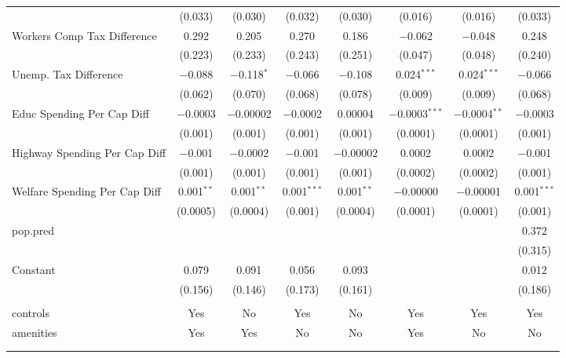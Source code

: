 \begin{table}[!htbp]
\begin{tabular}{@{\extracolsep{5pt}}lccccccc}
  & (0.033) & (0.030) & (0.032) & (0.030) & (0.016) & (0.016) & (0.033) \\ 
  Workers Comp Tax Difference & 0.292 & 0.205 & 0.270 & 0.186 & $-$0.062 & $-$0.048 & 0.248 \\ 
  & (0.223) & (0.233) & (0.243) & (0.251) & (0.047) & (0.048) & (0.240) \\ 
  Unemp. Tax Difference & $-$0.088 & $-$0.118$^{*}$ & $-$0.066 & $-$0.108 & 0.024$^{***}$ & 0.024$^{***}$ & $-$0.066 \\ 
  & (0.062) & (0.070) & (0.068) & (0.078) & (0.009) & (0.009) & (0.068) \\ 
  Educ Spending Per Cap Diff & $-$0.0003 & $-$0.00002 & $-$0.0002 & 0.00004 & $-$0.0003$^{***}$ & $-$0.0004$^{**}$ & $-$0.0003 \\ 
  & (0.001) & (0.001) & (0.001) & (0.001) & (0.0001) & (0.0001) & (0.001) \\ 
  Highway Spending Per Cap Diff & $-$0.001 & $-$0.0002 & $-$0.001 & $-$0.00002 & 0.0002 & 0.0002 & $-$0.001 \\ 
  & (0.001) & (0.001) & (0.001) & (0.001) & (0.0002) & (0.0002) & (0.001) \\ 
  Welfare Spending Per Cap Diff & 0.001$^{**}$ & 0.001$^{**}$ & 0.001$^{***}$ & 0.001$^{**}$ & $-$0.00000 & $-$0.00001 & 0.001$^{***}$ \\ 
  & (0.0005) & (0.0004) & (0.001) & (0.0004) & (0.0001) & (0.0001) & (0.001) \\ 
  pop.pred &  &  &  &  &  &  & 0.372 \\ 
  &  &  &  &  &  &  & (0.315) \\ 
  Constant & 0.079 & 0.091 & 0.056 & 0.093 &  &  & 0.012 \\ 
  & (0.156) & (0.146) & (0.173) & (0.161) &  &  & (0.186) \\ 
 \hline \\[-1.8ex] 
controls & Yes & No & Yes & No & Yes & Yes & Yes \\ 
amenities & Yes & Yes & No & No & Yes & No & No \\ 
\hline \\[-1.8ex] 
\hline 
\hline \\[-1.8ex] 
\end{tabular} 
\end{table} 
